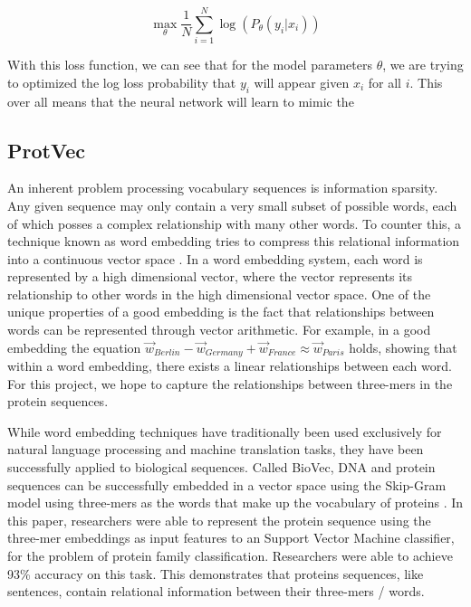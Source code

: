 \documentclass[pageno]{jpaper}
\begin{document}
\begin{equation} \label{eq:ed_loss}
	\underset{\theta}{\max} \frac{1}{N} \sum_{i = 1}^{N} \log(P_{\theta}(y_{i} \vert x_{i}))
\end{equation}

With this loss function, we can see that for the model parameters $\theta$, we are trying to optimized the log loss probability that $y_{i}$ will appear given $x_{i}$ for all $i$.  This over all means that the neural network will learn to mimic the 


\subsection{ProtVec}
An inherent problem processing vocabulary sequences is information sparsity.  Any given sequence may only contain a very small subset of possible words, each of which posses a complex relationship with many other words.  To counter this, a technique known as word embedding tries to compress this relational information into a continuous vector space \cite{mikolov:2013}.  In a word embedding system, each word is represented by a high dimensional vector, where the vector represents its relationship to other words in the high dimensional vector space.  One of the unique properties of a good embedding is the fact that relationships between words can be represented through vector arithmetic.  For example, in a good embedding the equation $\vec{w}_{Berlin} - \vec{w}_{Germany} + \vec{w}_{France} \approx \vec{w}_{Paris}$ holds, showing that within a word embedding, there exists a linear relationships between each word.  For this project, we hope to capture the relationships between three-mers in the protein sequences.

\par
While word embedding techniques have traditionally been used exclusively for natural language processing and machine translation tasks, they have been successfully applied to biological sequences.  Called BioVec, DNA and protein sequences can be successfully embedded in a vector space using the Skip-Gram model using three-mers as the words that make up the vocabulary of proteins \cite{asgari:2015}.  In this paper, researchers were able to represent the protein sequence using the three-mer embeddings as input features to an Support Vector Machine classifier, for the problem of protein family classification.  Researchers were able to achieve 93\% accuracy on this task.  This demonstrates that proteins sequences, like sentences, contain relational information between their three-mers / words.
\end{document}
